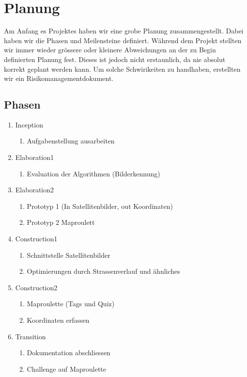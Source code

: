 \section{Planung}
Am Anfang es Projektes haben wir eine grobe Planung zusammengestellt. Dabei haben wir die Phasen und Meilensteine definiert. Während dem Projekt stellten wir immer wieder grössere oder kleinere Abweichungen an der zu Begin definierten Planung fest. Dieses ist jedoch nicht erstaunlich, da nie absolut korrekt geplant werden kann. Um solche Schwirikeiten zu handhaben, erstellten wir ein Risikomanagementdokument.

\subsection{Phasen}
\begin{enumerate}
  \item Inception
  \begin{enumerate}
    \item Aufgabenstellung ausarbeiten
  \end{enumerate}
  \item Elaboration1
  \begin{enumerate}
    \item Evaluation der Algorithmen (Bilderkennung)
  \end{enumerate}
  \item Elaboration2
  \begin{enumerate}
    \item Prototyp 1 (In Satellitenbilder, out Koordinaten)
    \item Prototyp 2 Maproulett
  \end{enumerate}
  \item Construction1
  \begin{enumerate}
    \item Schnittstelle Satellitenbilder
    \item Optimierungen durch Strassenverlauf und ähnliches
  \end{enumerate}
  \item Construction2
  \begin{enumerate}
    \item Maproulette (Tags und Quiz)
    \item Koordinaten erfassen	
  \end{enumerate}
  \item Transition
  \begin{enumerate}
    \item Dokumentation abschliessen
    \item Challenge auf Maproulette
  \end{enumerate}
\end{enumerate}

